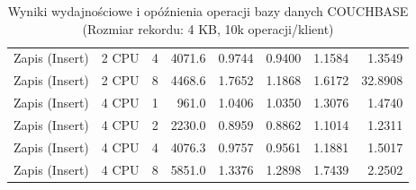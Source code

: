 \begin{table}[ht]
{\begin{tabular}{llcrrrrr}
Zapis (Insert) & 2 CPU & 4 & 4071.6 & 0.9744 & 0.9400 & 1.1584 & 1.3549 \\
Zapis (Insert) & 2 CPU & 8 & 4468.6 & 1.7652 & 1.1868 & 1.6172 & 32.8908 \\
Zapis (Insert) & 4 CPU & 1 & 961.0 & 1.0406 & 1.0350 & 1.3076 & 1.4740 \\
Zapis (Insert) & 4 CPU & 2 & 2230.0 & 0.8959 & 0.8862 & 1.1014 & 1.2311 \\
Zapis (Insert) & 4 CPU & 4 & 4076.3 & 0.9757 & 0.9561 & 1.1881 & 1.5017 \\
Zapis (Insert) & 4 CPU & 8 & 5851.0 & 1.3376 & 1.2898 & 1.7439 & 2.2502 \\
\bottomrule
\end{tabular}%
}
\caption{Wyniki wydajnościowe i opóźnienia operacji bazy danych COUCHBASE (Rozmiar rekordu: 4 KB, 10k operacji/klient)}
\label{tab:latency_couchbase_medium_10000}
\end{table}
